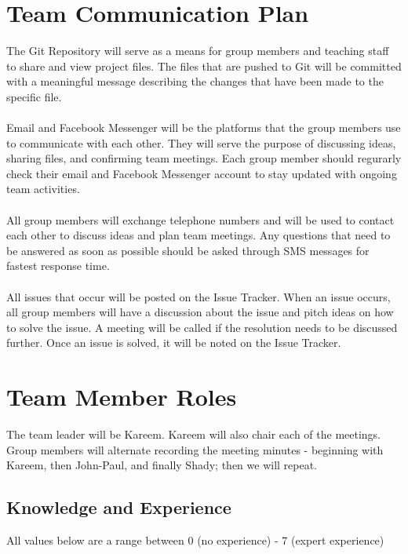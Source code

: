\documentclass{article}
\begin{document}
\section{Team Communication Plan}
The Git Repository will serve as a means for group members and teaching staff to share and view project files. The files that are pushed to Git will be committed with a meaningful message describing the changes that have been made to the specific file. \\
\\
\indent Email and Facebook Messenger will be the platforms that the group members use to communicate with each other. They will serve the purpose of discussing ideas, sharing files, and confirming team meetings. Each group member should regurarly check their email and Facebook Messenger account to stay updated with ongoing team activities.\\
\\
\indent All group members will exchange telephone numbers and will be used to contact each other to discuss ideas and plan team meetings. Any questions that need to be answered as soon as possible should be asked through SMS messages for fastest response time. \\
\\
\indent All issues that occur will be posted on the Issue Tracker. When an issue occurs, all group members will have a discussion about the issue and pitch ideas on how to solve the issue. A meeting will be called if the resolution needs to be discussed further. Once an issue is solved, it will be noted on the Issue Tracker.

\section{Team Member Roles}
The team leader will be Kareem. Kareem will also chair each of the meetings. Group members will alternate recording the meeting minutes - beginning with Kareem, then John-Paul, and finally Shady; then we will repeat.

\subsection{Knowledge and Experience}

All values below are a range between 0 (no experience) - 7 (expert experience)
\end{document}
